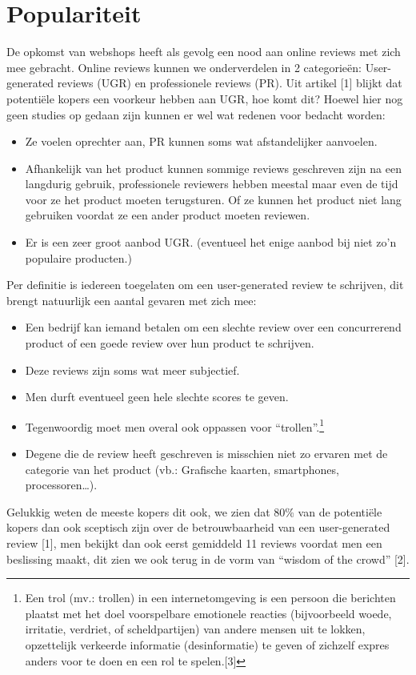 \documentclass[a4paper]{article}
\begin{document}
\section{Populariteit}
De opkomst van webshops heeft als gevolg een nood aan online reviews met zich mee gebracht. Online reviews kunnen we onderverdelen in 2 categorieën: User-generated reviews (UGR) en professionele reviews (PR). 
Uit artikel [1] blijkt dat potentiële kopers een voorkeur hebben aan UGR, hoe komt dit? 
Hoewel hier nog geen studies op gedaan zijn kunnen er wel wat redenen voor bedacht worden:
\begin{itemize}
\item Ze voelen oprechter aan, PR kunnen soms wat afstandelijker aanvoelen.
\item Afhankelijk van het product kunnen sommige reviews geschreven zijn na een langdurig gebruik, professionele reviewers hebben meestal maar even de tijd voor ze het product moeten terugsturen. Of ze kunnen het product niet lang gebruiken voordat ze een ander product moeten reviewen.
\item Er is een zeer groot aanbod UGR. (eventueel het enige aanbod bij niet zo’n populaire producten.)
\end{itemize}
\newpage
Per definitie is iedereen toegelaten om een user-generated review te schrijven, dit brengt natuurlijk een aantal gevaren met zich mee:
\begin{itemize}
\item Een bedrijf kan iemand betalen om een slechte review over een concurrerend product of een goede review over hun product te schrijven.
\item Deze reviews zijn soms wat meer subjectief.
\item Men durft eventueel geen hele slechte scores te geven.
\item Tegenwoordig moet men overal ook oppassen voor “trollen”.\footnote{Een trol (mv.: trollen) in een internetomgeving is een persoon die berichten plaatst met het doel voorspelbare emotionele reacties (bijvoorbeeld woede, irritatie, verdriet, of scheldpartijen) van andere mensen uit te lokken, opzettelijk verkeerde informatie (desinformatie) te geven of zichzelf expres anders voor te doen en een rol te spelen.[3]}
\item Degene die de review heeft geschreven is misschien niet zo ervaren met de categorie van het product (vb.: Grafische kaarten, smartphones, processoren…).
\end{itemize}
Gelukkig weten de meeste kopers dit ook, we zien dat 80\% van de potentiële kopers dan ook sceptisch zijn over de betrouwbaarheid van een user-generated review [1], men bekijkt dan ook eerst gemiddeld 11 reviews voordat men een beslissing maakt, dit zien we ook terug in de vorm van “wisdom of the crowd” [2].
\end{document}
